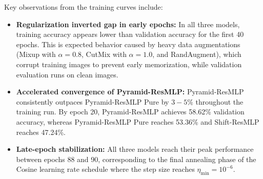 Key observations from the training curves include:
\begin{itemize}
    \item \textbf{Regularization inverted gap in early epochs:} In all three models, training accuracy appears lower than validation accuracy for the first 40 epochs. This is expected behavior caused by heavy data augmentations (Mixup with $\alpha=0.8$, CutMix with $\alpha=1.0$, and RandAugment), which corrupt training images to prevent early memorization, while validation evaluation runs on clean images.
    \item \textbf{Accelerated convergence of Pyramid-ResMLP:} Pyramid-ResMLP consistently outpaces Pyramid-ResMLP Pure by $3-5\%$ throughout the training run. By epoch 20, Pyramid-ResMLP achieves 58.62\% validation accuracy, whereas Pyramid-ResMLP Pure reaches 53.36\% and Shift-ResMLP reaches 47.24\%.
    \item \textbf{Late-epoch stabilization:} All three models reach their peak performance between epochs 88 and 90, corresponding to the final annealing phase of the Cosine learning rate schedule where the step size reaches $\eta_{\text{min}} = 10^{-6}$.
\end{itemize}

